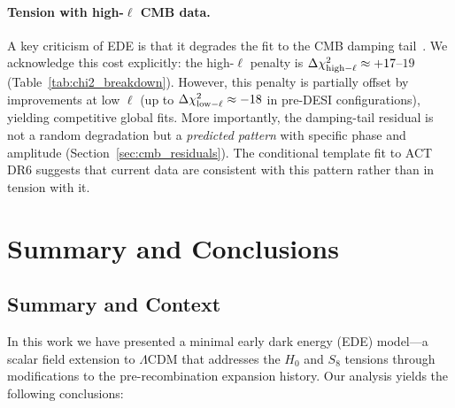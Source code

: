 \documentclass[a4paper,11pt]{article}
\begin{document}
\paragraph{Tension with high-$\ell$ CMB data.}
A key criticism of EDE is that it degrades the fit to the CMB damping tail~\cite{Hill2020}. We acknowledge this cost explicitly: the high-$\ell$ penalty is $\Delta\chi^2_{\rm high-\ell} \approx +17$--$19$ (Table~\ref{tab:chi2_breakdown}). However, this penalty is partially offset by improvements at low $\ell$ (up to $\Delta\chi^2_{\rm low-\ell} \approx -18$ in pre-DESI configurations), yielding competitive global fits. More importantly, the damping-tail residual is not a random degradation but a \emph{predicted pattern} with specific phase and amplitude (Section~\ref{sec:cmb_residuals}). The conditional template fit to ACT DR6 suggests that current data are consistent with this pattern rather than in tension with it.


\section{Summary and Conclusions}

\subsection*{Summary and Context}

In this work we have presented a minimal early dark energy (EDE) model---a scalar field extension to $\Lambda$CDM that addresses the $H_0$ and $S_8$ tensions through modifications to the pre-recombination expansion history. Our analysis yields the following conclusions:
\end{document}
